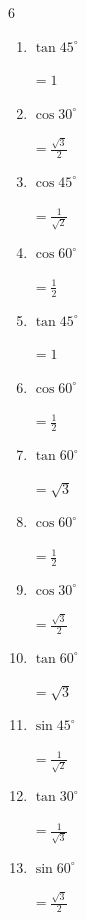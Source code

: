 \begin{multicols}{6}
\begin{enumerate}
        $\displaystyle =\frac{1}{\sqrt{3}}$

  \item $\displaystyle \tan{45^\circ}$

        $\displaystyle =1$

  \item $\displaystyle \cos{30^\circ}$

        $\displaystyle =\frac{\sqrt{3}}{2}$

  \item $\displaystyle \cos{45^\circ}$

        $\displaystyle =\frac{1}{\sqrt{2}}$

  \item $\displaystyle \cos{60^\circ}$

        $\displaystyle =\frac{1}{2}$

  \item $\displaystyle \tan{45^\circ}$

        $\displaystyle =1$

  \item $\displaystyle \cos{60^\circ}$

        $\displaystyle =\frac{1}{2}$

  \item $\displaystyle \tan{60^\circ}$

        $\displaystyle =\sqrt{3}$

  \item $\displaystyle \cos{60^\circ}$

        $\displaystyle =\frac{1}{2}$

  \item $\displaystyle \cos{30^\circ}$

        $\displaystyle =\frac{\sqrt{3}}{2}$

  \item $\displaystyle \tan{60^\circ}$

        $\displaystyle =\sqrt{3}$

  \item $\displaystyle \sin{45^\circ}$

        $\displaystyle =\frac{1}{\sqrt{2}}$

  \item $\displaystyle \tan{30^\circ}$

        $\displaystyle =\frac{1}{\sqrt{3}}$

  \item $\displaystyle \sin{60^\circ}$

        $\displaystyle =\frac{\sqrt{3}}{2}$


\end{enumerate}
\end{multicols}
